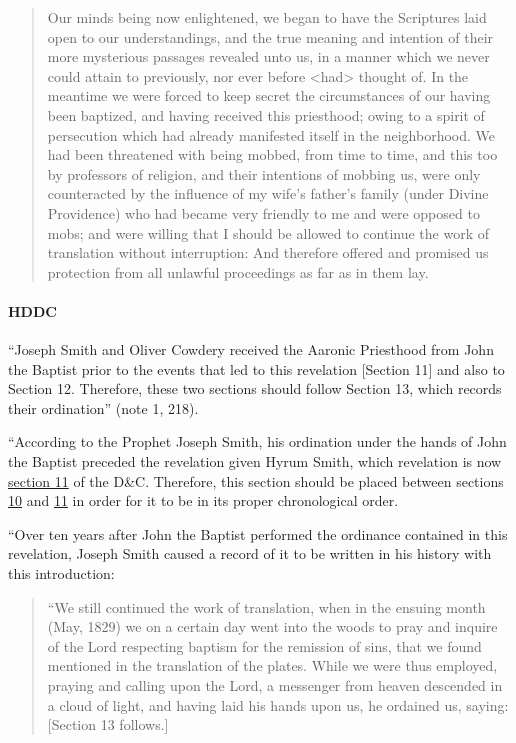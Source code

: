 \begin{quote}
				Our minds being now enlightened, we began to have the Scriptures laid open to our understandings, and the true meaning and intention of their more mysterious passages revealed unto us, in a manner which we never could attain to previously, nor ever before <had> thought of. In the meantime we were forced to keep secret the circumstances of our having been baptized, and having received this priesthood; owing to a spirit of persecution which had already manifested itself in the neighborhood. We had been threatened with being mobbed, from time to time, and this too by professors of religion, and their intentions of mobbing us, were only counteracted by the influence of my wife's father's family (under Divine Providence) who had became very friendly to me and were opposed to mobs; and were willing that I should be allowed to continue the work of translation without interruption: And therefore offered and promised us protection from all unlawful proceedings as far as in them lay.
			\end{quote}
		
		\paragraph{HDDC}
		
			``Joseph Smith and Oliver Cowdery received the Aaronic Priesthood from John the Baptist prior to the events that led to this revelation [Section 11] and also to Section 12. Therefore, these two sections should follow Section 13, which records their ordination'' (note 1, 218).
			
			``According to the Prophet Joseph Smith, his ordination under the hands of John the Baptist preceded the revelation given Hyrum Smith, which revelation is now \hyperref[DC11]{section 11} of the D\&C. Therefore, this section should be placed between sections \hyperref[DC10]{10} and \hyperref[DC11]{11} in order for it to be in its proper chronological order.
			
			``Over ten years after John the Baptist performed the ordinance contained in this revelation, Joseph Smith caused a record of it to be written in his history with this introduction:
			
				\begin{quote}
					``We still continued the work of translation, when in the ensuing month (May, 1829) we on a certain day went into the woods to pray and inquire of the Lord respecting baptism for the remission of sins, that we found mentioned in the translation of the plates. While we were thus employed, praying and calling upon the Lord, a messenger from heaven descended in a cloud of light, and having laid his hands upon us, he ordained us, saying: [Section 13 follows.]
				\end{quote}
				
